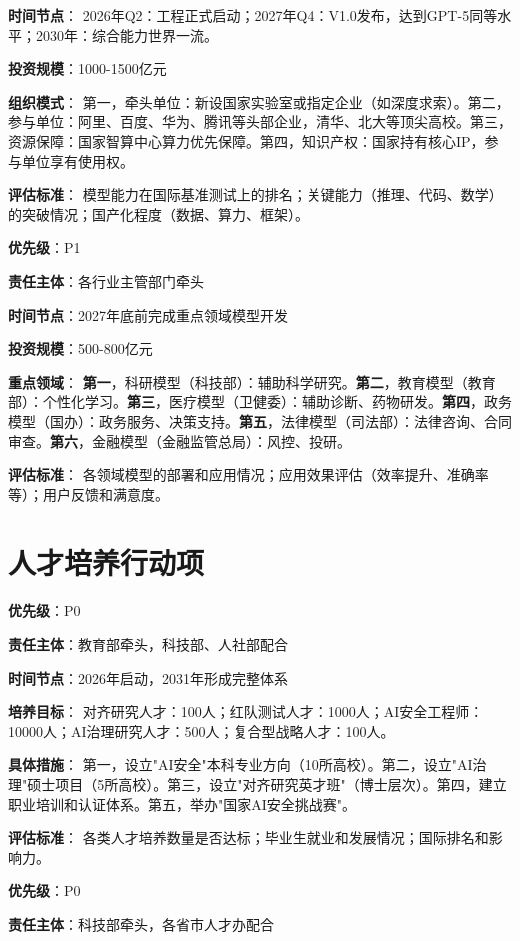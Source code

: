 \textbf{时间节点}：
2026年Q2：工程正式启动；2027年Q4：V1.0发布，达到GPT-5同等水平；2030年：综合能力世界一流。

\textbf{投资规模}：1000-1500亿元

\textbf{组织模式}：
第一，牵头单位：新设国家实验室或指定企业（如深度求索）。第二，参与单位：阿里、百度、华为、腾讯等头部企业，清华、北大等顶尖高校。第三，资源保障：国家智算中心算力优先保障。第四，知识产权：国家持有核心IP，参与单位享有使用权。

\textbf{评估标准}：
模型能力在国际基准测试上的排名；关键能力（推理、代码、数学）的突破情况；国产化程度（数据、算力、框架）。

\textbf{优先级}：P1

\textbf{责任主体}：各行业主管部门牵头

\textbf{时间节点}：2027年底前完成重点领域模型开发

\textbf{投资规模}：500-800亿元

\textbf{重点领域}：
\textbf{第一}，科研模型（科技部）：辅助科学研究。\textbf{第二}，教育模型（教育部）：个性化学习。\textbf{第三}，医疗模型（卫健委）：辅助诊断、药物研发。\textbf{第四}，政务模型（国办）：政务服务、决策支持。\textbf{第五}，法律模型（司法部）：法律咨询、合同审查。\textbf{第六}，金融模型（金融监管总局）：风控、投研。

\textbf{评估标准}：
各领域模型的部署和应用情况；应用效果评估（效率提升、准确率等）；用户反馈和满意度。

\section{人才培养行动项}

\textbf{优先级}：P0

\textbf{责任主体}：教育部牵头，科技部、人社部配合

\textbf{时间节点}：2026年启动，2031年形成完整体系

\textbf{培养目标}：
对齐研究人才：100人；红队测试人才：1000人；AI安全工程师：10000人；AI治理研究人才：500人；复合型战略人才：100人。

\textbf{具体措施}：
第一，设立"AI安全"本科专业方向（10所高校）。第二，设立"AI治理"硕士项目（5所高校）。第三，设立"对齐研究英才班"（博士层次）。第四，建立职业培训和认证体系。第五，举办"国家AI安全挑战赛"。

\textbf{评估标准}：
各类人才培养数量是否达标；毕业生就业和发展情况；国际排名和影响力。

\textbf{优先级}：P0

\textbf{责任主体}：科技部牵头，各省市人才办配合

